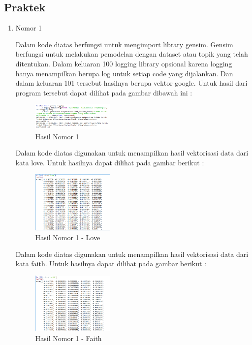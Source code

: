 \subsection{Praktek}
\begin{enumerate}
\item Nomor 1

Dalam kode diatas berfungsi untuk mengimport library gensim. Gensim berfungsi untuk melakukan pemodelan dengan dataset atau topik yang telah ditentukan. Dalam keluaran 100 logging library opsional karena logging hanya menampilkan berupa log untuk setiap code yang dijalankan. Dan dalam keluaran 101 tersebut hasilnya berupa vektor google. Untuk hasil dari program tersebut dapat dilihat pada gambar dibawah ini :
\hfill\break
	\begin{figure}[H]
		\includegraphics[width=4cm]{figures/1174054/5/7.png}
		\centering
		\caption{Hasil Nomor 1}
	\end{figure}
	

Dalam kode diatas digunakan untuk menampilkan hasil vektorisasi data dari kata love. Untuk hasilnya dapat dilihat pada gambar berikut :
\hfill\break
	\begin{figure}[H]
		\includegraphics[width=4cm]{figures/1174054/5/8.png}
		\centering
		\caption{Hasil Nomor 1 - Love}
	\end{figure}


Dalam kode diatas digunakan untuk menampilkan hasil vektorisasi data dari kata faith. Untuk hasilnya dapat dilihat pada gambar berikut :
\hfill\break
	\begin{figure}[H]
		\includegraphics[width=4cm]{figures/1174054/5/9.png}
		\centering
		\caption{Hasil Nomor 1 - Faith}
	\end{figure}
	

\end{enumerate}
